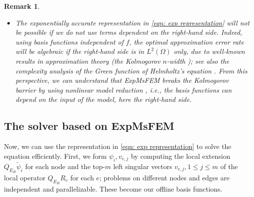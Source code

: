 \documentclass[12pt]{caltech_thesis}
\newtheorem{remark}[theorem]{Remark}
\numberwithin{equation}{section}
\begin{document}
\begin{remark}
\begin{itemize}
        Second, for the Helmholtz equation, the stability constant of the solution operator can depend on $k$; indeed, this is the main cause of the pollution effect \cite{babuska1997pollution}. Denote the stability constant by $C_{\text{stab}}(k)$ such that $\|u\|_{\mathcal{H}(\Omega)} \leq C_{\text{stab}}(k)\|f\|_{L^2(\Omega)}$. A prevalent and reasonable assumption on the constant is that of polynomial growth, namely $C_{\mathrm{stab}}(k)\leq C(1+k^\gamma)$ for some constants $\gamma$ and $C$; see, for example, \cite{lafontaine2019most}. In such case, we can further bound the error by
        \[\exp(-bm^{\frac{1}{d+1}})(\|u\|_{\mathcal{H}(\Omega)}+\|f\|_{L^2(\Omega)}) \leq  \exp(-bm^{\frac{1}{d+1}})(C(1+k^\gamma)+1)\|f\|_{L^2(\Omega)}\, .\]
        Therefore, once the number of basis functions per edge $m \sim \log^{d+1}(k)$ (logarithmically on $k$ only), the approximation error can be uniformly small for all $k$. It implies that the quantity $\eta(S)$ in \eqref{apro proxy} is small, which is important in determining the error of Galerkin's methods. In this sense, ExpMsFEM overcomes the difficulty of the pollution effect by using basis functions whose number scales at most $\log^{d+1}(k)$.
        \item The exponentially accurate representation in \eqref{eqn: exp representation} will not be possible if we do not use terms dependent on the right-hand side. Indeed, using basis functions independent of $f$, the optimal approximation error rate will be algebraic if the right-hand side is in $L^2(\Omega)$ only, due to well-known results in approximation theory (the Kolmogorov $n$-width \cite{pinkus2012n, melenk2000n}); see also the complexity analysis of the Green function of Helmholtz's equation \cite{engquist2018approximate}. From this perspective, we can understand that ExpMsFEM breaks the Kolmogorov barrier by using \textit{nonlinear model reduction} \cite{peherstorfer2022breaking}, i.e., the basis functions can depend on the input of the model, here the right-hand side.
    \end{itemize}
\end{remark}

\subsection{The solver based on ExpMsFEM}
\label{sec: alg ExpMsFEM}
Now, we can use the representation in \eqref{eqn: exp representation} to solve the equation efficiently. First, we form $\psi_i, v_{e,j}$ by computing the local extension $Q_{E_H}\tilde{\psi}_i$ for each node and the top-$m$ left singular vectors $v_{e,j}, 1\leq j \leq m$ of the local operator $Q_{E_H}R_e$ for each $e$; problems on different nodes and edges are independent and parallelizable. These become our offline basis functions.
\end{document}
